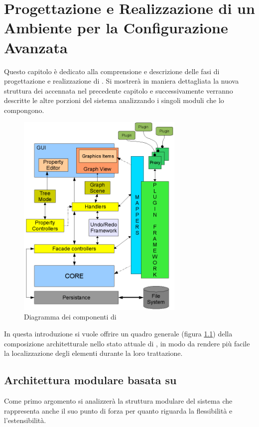\chapter{Progettazione e Realizzazione di un Ambiente per la Configurazione Avanzata}\label{capitolo:progettazione_realizzazione}
Questo capitolo è dedicato alla comprensione e descrizione delle fasi di progettazione e realizzazione di \visualnetkit{}. Si mostrerà in maniera dettagliata la nuova struttura dei \plugin{} accennata nel precedente capitolo e successivamente verranno descritte le altre porzioni del sistema analizzando i singoli moduli che lo compongono.

\begin{figure}[!htb]
	\centering
	\includegraphics[width=8cm]{images/diagramma_componenti_vnetkit.png}
	\caption{Diagramma dei componenti di \visualnetkit{}}
	\label{figura:vn_componenti}
\end{figure}

In questa introduzione si vuole offrire un quadro generale (figura \ref{figura:vn_componenti}) della composizione architetturale nello stato attuale di \visualnetkit{}, in modo da rendere più facile la localizzazione degli elementi durante la loro trattazione.

\section{Architettura modulare basata su \plugin{}}
Come primo argomento si analizzerà la struttura modulare del sistema che rappresenta anche il suo punto di forza per quanto riguarda la flessibilità e l'estensibilità. 

